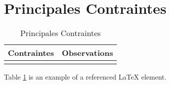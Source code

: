 \newpage
\section{Principales Contraintes}

\begin{table}[h!]
\begin{center}
\begin{tabular}{|p{7cm}|p{7cm}|}
\hline
Contraintes	&Observations\\
\hline
&\\
\hline
\end{tabular}
\end{center}
\caption{Principales Contraintes}
\label{table:5555}
\end{table}
Table \ref{table:5555} is an example of a referenced \LaTeX{} element.
